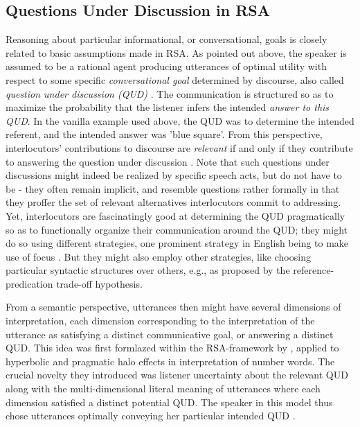 \subsection{Questions Under Discussion in RSA}
Reasoning about particular informational, or conversational, goals is closely related to basic assumptions made in RSA.
As pointed out above, the speaker is assumed to be a rational agent producing utterances of optimal utility with respect to some specific \emph{conversational goal} determined by discourse, also called \emph{question under discussion (QUD)}  \parencite{lassiter2017adjectival, roberts2012information}. The communication is structured so as to maximize the probability that the listener infers the intended \emph{answer to this QUD}. In the vanilla example used above, the QUD was to determine the intended referent, and the intended answer was 'blue square'. From this perspective, interlocutors' contributions to discourse are \emph{relevant} if and only if they contribute to answering the question under discussion \parencite{roberts2012information}. Note that such questions under discussions might indeed be realized by specific speech acts, but do not have to be - they often remain implicit, and resemble questions rather formally in that they proffer the set of relevant alternatives interlocutors commit to addressing. Yet, interlocutors are fascinatingly good at determining the QUD pragmatically so as to functionally organize their communication around the QUD; they might do so using different strategies, one prominent strategy in English being to make use of focus \parencite{roberts2012information, krifka2008basic}. But they might also employ other strategies, like choosing particular syntactic structures over others, e.g., as proposed by the reference-predication trade-off hypothesis.  

From a semantic perspective, utterances then might have several dimensions of interpretation, each dimension corresponding to the interpretation of the utterance as satisfying a distinct communicative goal, or answering a distinct QUD. This idea was first formlazed within the RSA-framework by \textcite{kao2014nonliteral}, applied to hyperbolic and pragmatic halo effects in interpretation of number words. The crucial novelty they introduced was listener uncertainty about the relevant QUD along with the multi-dimensional literal meaning of utterances where each dimension satisfied a distinct potential QUD. The speaker in this model thus chose utterances optimally conveying her particular intended QUD \parencite{kao2014nonliteral}. 

